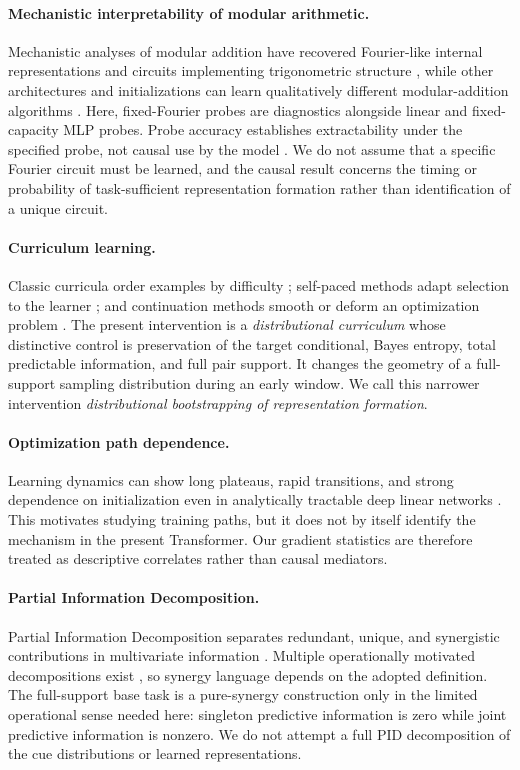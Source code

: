\documentclass{article}
\begin{document}
\paragraph{Mechanistic interpretability of modular arithmetic.}
Mechanistic analyses of modular addition have recovered Fourier-like internal
representations and circuits implementing trigonometric structure
\cite{nanda2023progress}, while other architectures and initializations can
learn qualitatively different modular-addition algorithms
\cite{zhong2023clock}. Here, fixed-Fourier probes are diagnostics alongside
linear and fixed-capacity MLP probes. Probe accuracy establishes extractability
under the specified probe, not causal use by the model
\cite{hewitt2019probes,belinkov2022probes}. We do not assume that a specific
Fourier circuit must be learned, and the causal result concerns the timing or
probability of task-sufficient representation formation rather than
identification of a unique circuit.

\paragraph{Curriculum learning.}
Classic curricula order examples by difficulty
\cite{bengio2009curriculum,hacohen2019curriculum}; self-paced methods adapt
selection to the learner \cite{jiang2015selfpaced}; and continuation methods
smooth or deform an optimization problem \cite{mobahi2016diffusion}. The
present intervention is a \emph{distributional curriculum} whose distinctive
control is preservation of the target conditional, Bayes entropy, total
predictable information, and full pair support. It changes the geometry of a
full-support sampling distribution during an early window. We call this
narrower intervention \emph{distributional bootstrapping of representation
formation}.

\paragraph{Optimization path dependence.}
Learning dynamics can show long plateaus, rapid transitions, and strong
dependence on initialization even in analytically tractable deep linear
networks \cite{saxe2014exact}. This motivates studying training paths, but it
does not by itself identify the mechanism in the present Transformer. Our
gradient statistics are therefore treated as descriptive correlates rather
than causal mediators.

\paragraph{Partial Information Decomposition.}
Partial Information Decomposition separates redundant, unique, and
synergistic contributions in multivariate information
\cite{williams2010pid}. Multiple operationally motivated decompositions
exist \cite{bertschinger2014unique}, so synergy language depends on the
adopted definition. The full-support base task is a pure-synergy construction
only in the limited operational sense needed here: singleton predictive
information is zero while joint predictive information is nonzero. We do not
attempt a full PID decomposition of the cue distributions or learned
representations.
\end{document}
